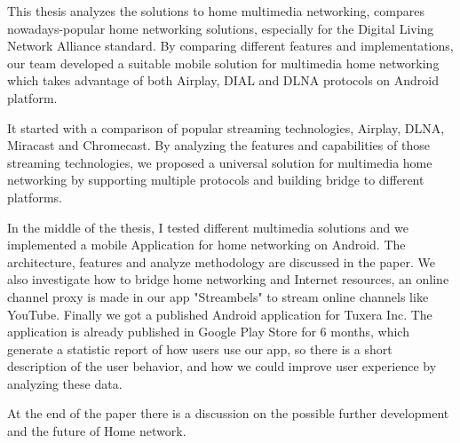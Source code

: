 
 This thesis analyzes the solutions to home multimedia networking, compares 
 nowadays-popular home networking solutions, especially for the Digital Living
 Network Alliance standard. By comparing different features and
 implementations, our team developed a suitable mobile solution for multimedia
 home networking which takes advantage of both Airplay,  DIAL and DLNA
 protocols on Android platform.

 It started with a comparison of popular streaming technologies, Airplay, 
 DLNA, Miracast and Chromecast. By analyzing the features and capabilities 
 of those streaming technologies, we proposed a universal solution for 
 multimedia home networking by supporting multiple protocols and building
 bridge to different platforms.

 In the middle of the thesis, I tested different multimedia solutions and 
 we implemented a mobile Application for home networking on Android. The
 architecture, features and analyze methodology are discussed in the paper. We
 also investigate how to bridge home networking and Internet resources, an
 online channel proxy is made in our app "Streambels" to stream online
 channels like YouTube. Finally we got a published Android application for
 Tuxera Inc. The application is already published in Google Play Store for 6
 months, which generate a statistic report of how users use our app, so there
 is a short description of the user behavior, and how we could improve user
 experience by analyzing these data.

 At the end of the paper there is a discussion on the possible further
 development and the future of Home network.